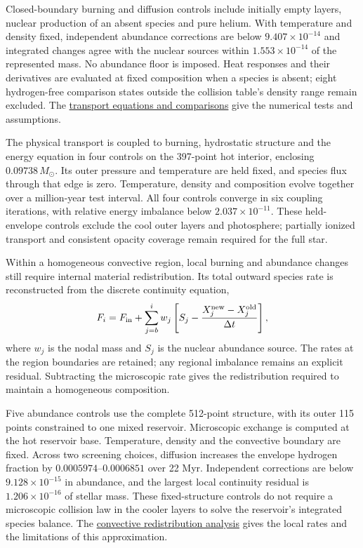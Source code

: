 \documentclass[11pt,letterpaper]{article}
\newcommand{\doc}[2]{\href{https://github.com/oklo/ember/blob/codex/atmosphere5000-density-checks/#1}{#2}}
\begin{document}
Closed-boundary burning and diffusion controls include initially empty
layers, nuclear production of an absent species and pure helium. With
temperature and density fixed, independent abundance corrections are below
$9.407\times10^{-14}$ and integrated changes agree with the nuclear sources
within $1.553\times10^{-14}$ of the represented mass. No abundance floor is
imposed. Heat responses and their derivatives are evaluated at fixed
composition when a species is absent; eight hydrogen-free comparison states
outside the collision table's density range remain excluded. The
\doc{docs/CONSERVATIVE_MATERIAL_TRANSPORT.md}{transport equations and comparisons}
give the numerical tests and assumptions.

The physical transport is coupled to burning, hydrostatic structure and the
energy equation in four controls on the 397-point hot interior, enclosing
$0.09738\,M_\odot$. Its outer pressure and temperature are held fixed, and
species flux through that edge is zero. Temperature, density and composition
evolve together over a million-year test interval. All four controls converge
in six coupling iterations, with relative energy imbalance below
$2.037\times10^{-11}$. These held-envelope controls exclude the cool outer
layers and photosphere; partially ionized transport and consistent opacity
coverage remain required for the full star.

Within a homogeneous convective region, local burning and abundance changes
still require internal material redistribution. Its total outward species rate
is reconstructed from the discrete continuity equation,
\begin{equation}
 F_i = F_{\rm in}+\sum_{j=b}^{i} w_j
 \left[S_j-\frac{X_j^{\rm new}-X_j^{\rm old}}{\Delta t}\right],
\end{equation}
where $w_j$ is the nodal mass and $S_j$ is the nuclear abundance source.
The rates at the region boundaries are retained; any regional imbalance
remains an explicit residual. Subtracting the microscopic rate gives the
redistribution required to maintain a homogeneous composition.

Five abundance controls use the complete 512-point structure, with its outer
115 points constrained to one mixed reservoir. Microscopic exchange is
computed at the hot reservoir base. Temperature, density and the convective
boundary are fixed. Across two screening choices, diffusion increases the
envelope hydrogen fraction by $0.0005974$--$0.0006851$ over 22 Myr.
Independent corrections are below $9.128\times10^{-15}$ in abundance, and
the largest local continuity residual is $1.206\times10^{-16}$ of stellar
mass. These fixed-structure controls do not require a microscopic collision
law in the cooler layers to solve the reservoir's integrated species balance.
The \doc{docs/CONVECTIVE_SPECIES_REDISTRIBUTION.md}{convective redistribution analysis}
gives the local rates and the limitations of this approximation.
\end{document}
